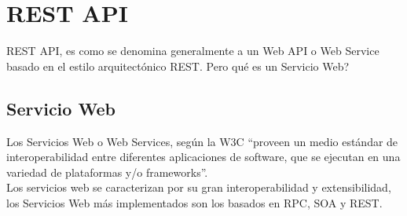 
\section{REST API}
\label{sec:REST API}

REST API, es como se denomina generalmente a un Web API o Web Service basado en el estilo arquitectónico REST. Pero qué es un Servicio Web?

\subsection{Servicio Web}
\label{sub:Servicio Web}

Los Servicios Web o Web Services, según la W3C ``proveen un medio estándar de interoperabilidad entre diferentes aplicaciones de software, que se ejecutan en una variedad de plataformas y/o frameworks''. \cite{w3c_web_service} \\

Los servicios web se caracterizan por su gran interoperabilidad y extensibilidad, los Servicios Web más implementados son los basados en RPC, SOA y REST. \\

